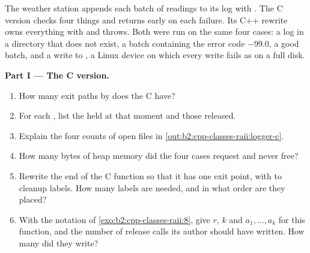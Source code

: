 \begin{problem}\label{pb:b2:cpp-classes-raii:1}
The weather station appends each batch of readings to its log with . The C version checks
four things and returns early on each failure. Its C++ rewrite owns everything with  and throws. Both were
run on the same four cases: a log in a directory that does not exist, a batch containing the error code
$-99.0$, a good batch, and a write to , a Linux device on which every write fails as on a full disk.

\label{lst:b2:cpp-classes-raii:logger-c}
\label{out:b2:cpp-classes-raii:logger-c}
\label{lst:b2:cpp-classes-raii:logger-cpp}
\label{out:b2:cpp-classes-raii:logger-cpp}

\medskip\noindent\textbf{Part I --- The C version.}\par\nopagebreak
\begin{enumerate}[beginpenalty=10000]
\item How many exit paths by  does the C  have?
\item For each , list the  held at that moment and those released.
\item Explain the four counts of open files in \cref{out:b2:cpp-classes-raii:logger-c}.
\item How many bytes of heap memory did the four cases request and never free?
\item Rewrite the end of the C function so that it has one exit point, with  to cleanup labels. How many
labels are needed, and in what order are they placed?
\item With the notation of \cref{exo:b2:cpp-classes-raii:8}, give $r$, $k$ and $a_1, \dots, a_k$ for this function,
and the number of release calls its author should have written. How many did they write?
\end{enumerate}


\end{problem}
